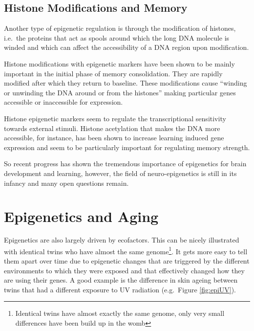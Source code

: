 \documentclass[
  11pt,
]{book}
\begin{document}
\hypertarget{histone-modifications-and-memory}{%
\subsection{Histone Modifications and Memory}\label{histone-modifications-and-memory}}

Another type of epigenetic regulation is through the modification of histones, i.e.~the proteins that act as spools around which the long DNA molecule is winded and which can affect the accessibility of a DNA region upon modification.

Histone modifications with epigenetic markers have been shown to be mainly important in the initial phase of memory consolidation. They are rapidly modified after which they return to baseline. These modifications cause ``winding or unwinding the DNA around or from the histones'' making particular genes accessible or inaccessible for expression.

Histone epigenetic markers seem to regulate the transcriptional sensitivity towards external stimuli. Histone acetylation that makes the DNA more accessible, for instance, has been shown to increase learning induced gene expression and seem to be particularly important for regulating memory strength.

So recent progress has shown the tremendous importance of epigenetics for brain development and learning, however, the field of neuro-epigenetics is still in its infancy and many open questions remain.

\hypertarget{epigenetics-and-aging}{%
\section{Epigenetics and Aging}\label{epigenetics-and-aging}}

Epigenetics are also largely driven by ecofactors. This can be nicely illustrated with identical twins who have almost the same genome\footnote{Identical twins have almost exactly the same genome, only very small differences have been build up in the womb}. It gets more easy to tell them apart over time due to epigenetic changes that are triggered by the different environments to which they were exposed and that effectively changed how they are using their genes. A good example is the difference in skin ageing between twins that had a different exposure to UV radiation (e.g.~Figure \ref{fig:epiUV}).
\end{document}
